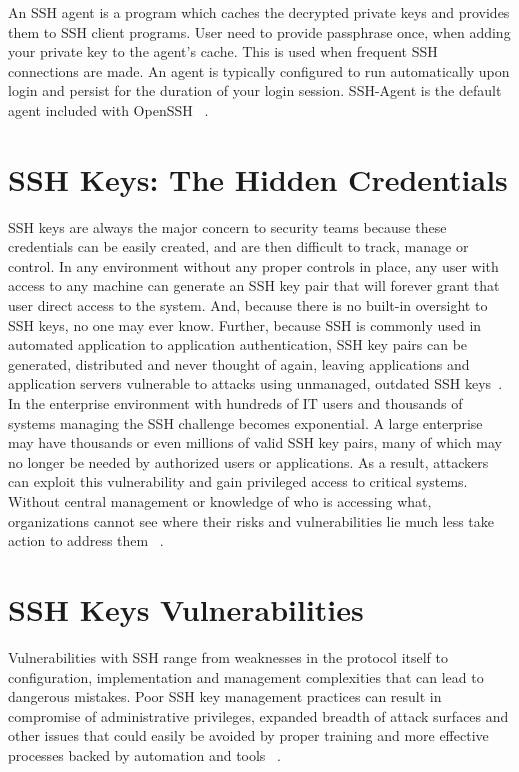 An SSH agent is a program which caches the decrypted private
keys and provides them to SSH client programs. User need to
provide passphrase once, when adding your private key 
to the agent's cache. This is used when frequent SSH connections
are made. An agent is typically configured to run automatically 
upon login and persist for the duration of your login session. 
SSH-Agent is the default agent included with OpenSSH
~\cite{hid-sp18-513-sshkeyinc}.

\section{SSH Keys: The Hidden Credentials} 
SSH keys are always the major concern to security teams because 
these credentials can be easily created, and are then difficult to
track, manage or control. In any environment without any proper
controls in place, any user with access to any machine can generate
an SSH key pair that will forever grant that user direct access to
the system. And, because there is no built-in oversight to SSH keys,
no one may ever know. Further, because SSH is commonly used in 
automated application to application authentication,
SSH key pairs can be generated, distributed and never thought of again, 
leaving applications and application servers vulnerable to attacks 
using unmanaged, outdated SSH keys~\cite{hid-sp18-513-cyberark}. 
In the enterprise environment with hundreds of IT users and 
thousands of systems managing the SSH challenge becomes exponential. 
A large enterprise may have thousands or even millions of valid 
SSH key pairs, many of which may no longer be needed by authorized 
users or applications. As a result, attackers can exploit this 
vulnerability and gain privileged access to critical systems. 
Without central management or knowledge of who 
is accessing what, organizations cannot see where their risks and
vulnerabilities lie much less take action to address them
~\cite{hid-sp18-513-cyberark}. 

\section{SSH Keys Vulnerabilities}
Vulnerabilities with SSH range from weaknesses in the protocol
itself to configuration, implementation and management 
complexities that can lead to dangerous mistakes.
Poor SSH key management practices can result in compromise 
of administrative privileges, expanded breadth of attack surfaces
and other issues that could easily be avoided by proper training
and more effective processes backed by automation and tools
~\cite{hid-sp18-513-sans}.

